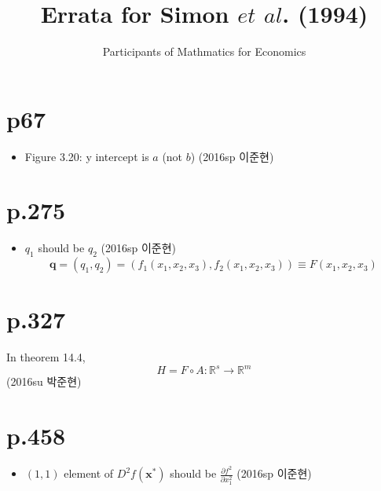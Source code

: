 \documentclass[a4paper]{article}
\title{Errata for Simon $et$ $al$. (1994)}
\author{Participants of Mathmatics for Economics}
\begin{document}
\maketitle
\section{p67} %
\label{sec:p67}
\begin{itemize}
	\item Figure 3.20: y intercept is $a$ (not $b$) (2016sp 이준현)
\end{itemize}

\section{p.275} %
\label{sec:p_275}
\begin{itemize}
	\item $q_1$ should be $q_2$ (2016sp 이준현)
	\[
		\mathbf{q}=(q_1,q_2)=\left(f_1(x_1,x_2,x_3),f_2(x_1,x_2,x_3)\right)\equiv F(x_1,x_2,x_3)
	\]
\end{itemize}

\section{p.327} %
\label{sec:p_327}
In theorem 14.4, 
\[
	H = F \circ A : \mathbb{R}^s \rightarrow \mathbb{R}^m
\]
(2016su 박준현)

\section{p.458} %
\label{sec:p_458}

\begin{itemize}
	\item $(1,1)$ element of $D^2 f(\mathbf{x^\ast})$ should be $\frac{\partial f^2}{\partial x_1^2}$ (2016sp 이준현)
\end{itemize}

\end{document}
